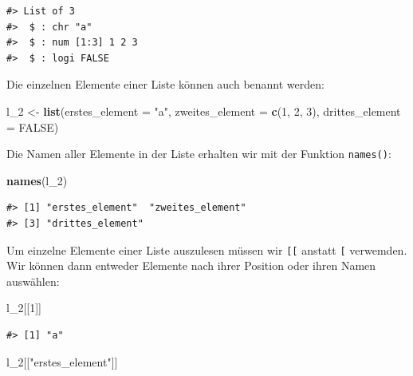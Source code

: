 \documentclass[]{tufte-book}
\newenvironment{Shaded}{}{}
\newcommand{\KeywordTok}[1]{\textcolor[rgb]{0.00,0.44,0.13}{\textbf{#1}}}
\newcommand{\DataTypeTok}[1]{\textcolor[rgb]{0.56,0.13,0.00}{#1}}
\newcommand{\DecValTok}[1]{\textcolor[rgb]{0.25,0.63,0.44}{#1}}
\newcommand{\StringTok}[1]{\textcolor[rgb]{0.25,0.44,0.63}{#1}}
\newcommand{\OtherTok}[1]{\textcolor[rgb]{0.00,0.44,0.13}{#1}}
\newcommand{\NormalTok}[1]{#1}
\begin{document}
\begin{verbatim}
#> List of 3
#>  $ : chr "a"
#>  $ : num [1:3] 1 2 3
#>  $ : logi FALSE
\end{verbatim}

Die einzelnen Elemente einer Liste können auch benannt werden:

\begin{Shaded}
\begin{Highlighting}[]
\NormalTok{l_}\DecValTok{2}\NormalTok{ <-}\StringTok{ }\KeywordTok{list}\NormalTok{(}\DataTypeTok{erstes_element =} \StringTok{"a"}\NormalTok{, }\DataTypeTok{zweites_element =} \KeywordTok{c}\NormalTok{(}\DecValTok{1}\NormalTok{, }
    \DecValTok{2}\NormalTok{, }\DecValTok{3}\NormalTok{), }\DataTypeTok{drittes_element =} \OtherTok{FALSE}\NormalTok{)}
\end{Highlighting}
\end{Shaded}

Die Namen aller Elemente in der Liste erhalten wir mit der Funktion
\texttt{names()}:

\begin{Shaded}
\begin{Highlighting}[]
\KeywordTok{names}\NormalTok{(l_}\DecValTok{2}\NormalTok{)}
\end{Highlighting}
\end{Shaded}

\begin{verbatim}
#> [1] "erstes_element"  "zweites_element"
#> [3] "drittes_element"
\end{verbatim}

Um einzelne Elemente einer Liste auszulesen müssen wir \texttt{{[}{[}}
anstatt \texttt{{[}} verwemden. Wir können dann entweder Elemente nach
ihrer Position oder ihren Namen auswählen:

\begin{Shaded}
\begin{Highlighting}[]
\NormalTok{l_}\DecValTok{2}\NormalTok{[[}\DecValTok{1}\NormalTok{]]}
\end{Highlighting}
\end{Shaded}

\begin{verbatim}
#> [1] "a"
\end{verbatim}

\begin{Shaded}
\begin{Highlighting}[]
\NormalTok{l_}\DecValTok{2}\NormalTok{[[}\StringTok{"erstes_element"}\NormalTok{]]}
\end{Highlighting}
\end{Shaded}
\end{document}

